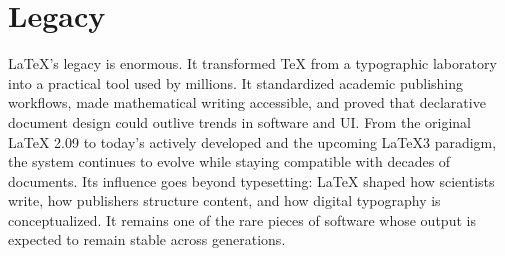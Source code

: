 \documentclass[a4paper,twoside]{article}
\begin{document}
\section{Legacy}
\LaTeX{}'s legacy is enormous. It transformed \TeX{} from a typographic laboratory into a practical tool used by millions. It standardized academic publishing workflows, made mathematical writing accessible, and proved that declarative document design could outlive trends in software and UI. From the original \LaTeX{} 2.09 to today's actively developed \LaTeXe{} and the upcoming LaTeX3 paradigm, the system continues to evolve while staying compatible with decades of documents. Its influence goes beyond typesetting: \LaTeX{} shaped how scientists write, how publishers structure content, and how digital typography is conceptualized. It remains one of the rare pieces of software whose output is expected to remain stable across generations.
\end{document}
